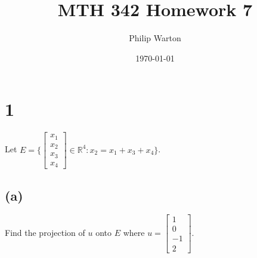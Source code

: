 \documentclass{article}
\begin{document}
\title{MTH 342 Homework 7}
\author{Philip Warton}
\date{\today}
\maketitle
\section*{1}
Let $E = \{ \begin{bmatrix}x_1\\x_2\\x_3\\x_4\end{bmatrix} \in \mathbb{R}^4: x_2 = x_1 + x_3 + x_4 \}$.
\subsection*{(a)}
Find the projection of $u$ onto $E$ where $u = \begin{bmatrix}1\\0\\-1\\2\end{bmatrix}$. 
\end{document}
